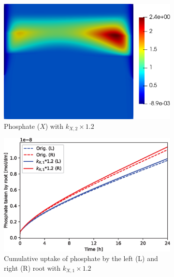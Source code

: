 \documentclass[11pt]{article}
\numberwithin{equation}{section}
\begin{document}
\begin{figure}[!htb]
\centering
\begin{subfigure}[t]{0.35\textwidth}
    \includegraphics[width=\textwidth]{Figures/X_kxup20.png}
    \caption{Phosphate ($X$) with $k_{X,2}\times 1.2$}
    \label{fig:numexp_kup1}
\end{subfigure}
\hspace{1cm}
\begin{subfigure}[t]{0.4\textwidth}
    \includegraphics[width=\textwidth]{Figures/kxup20.eps}
    \caption{Cumulative uptake of phosphate by the left (L) and right (R) root with $k_{X,1}\times 1.2$}
    \label{fig:numexp_kup2}
\end{subfigure}
\qquad
\begin{subfigure}[t]{0.35\textwidth}

\end{subfigure}
\end{figure}
\end{document}
